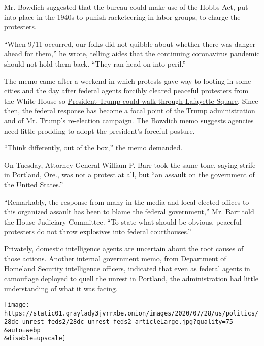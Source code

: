Mr. Bowdich suggested that the bureau could make use of the Hobbs Act,
put into place in the 1940s to punish racketeering in labor groups, to
charge the protesters.

``When 9/11 occurred, our folks did not quibble about whether there was
danger ahead for them,'' he wrote, telling aides that the
\href{https://www.nytimes3xbfgragh.onion/interactive/2020/us/coronavirus-us-cases.html}{continuing
coronavirus pandemic} should not hold them back. ``They ran head-on into
peril.''

The memo came after a weekend in which protests gave way to looting in
some cities and the day after federal agents forcibly cleared peaceful
protesters from the White House so
\href{https://www.nytimes3xbfgragh.onion/2020/06/02/us/politics/trump-walk-lafayette-square.html}{President
Trump could walk through Lafayette Square}. Since then, the federal
response has become a focal point of the Trump administration
\href{https://www.nytimes3xbfgragh.onion/2020/07/21/us/politics/trump-portland-federal-agents.html}{and
of Mr. Trump's re-election campaign}. The Bowdich memo suggests agencies
need little prodding to adopt the president's forceful posture.

``Think differently, out of the box,'' the memo demanded.

On Tuesday, Attorney General William P. Barr took the same tone, saying
strife in
\href{https://www.nytimes3xbfgragh.onion/2020/07/29/us/protests-portland-federal-withdrawal.html}{Portland},
Ore., was not a protest at all, but ``an assault on the government of
the United States.''

``Remarkably, the response from many in the media and local elected
offices to this organized assault has been to blame the federal
government,'' Mr. Barr told the House Judiciary Committee. ``To state
what should be obvious, peaceful protesters do not throw explosives into
federal courthouses.''

Privately, domestic intelligence agents are uncertain about the root
causes of those actions. Another internal government memo, from
Department of Homeland Security intelligence officers, indicated that
even as federal agents in camouflage deployed to quell the unrest in
Portland, the administration had little understanding of what it was
facing.

\texttt{[image: https://static01.graylady3jvrrxbe.onion/images/2020/07/28/us/politics/28dc-unrest-feds2/28dc-unrest-feds2-articleLarge.jpg?quality=75\\\&auto=webp\\\&disable=upscale]}

